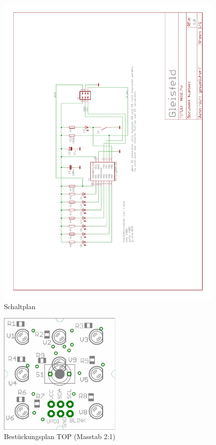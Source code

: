\documentclass[10pt,a4paper]{article}
\begin{document}
\begin{figure}[hbtp!]
\includegraphics[scale=0.7]{feld_hw.pdf}
\caption{Schaltplan}
\end{figure}
\begin{figure}[hbtp!]
\centering
\includegraphics[width=6cm]{feld_hw_top_comp.pdf}
\caption[Bestückungsplan TOP]{Bestückungsplan TOP (Masstab 2:1)}
\end{figure}
\end{document}
